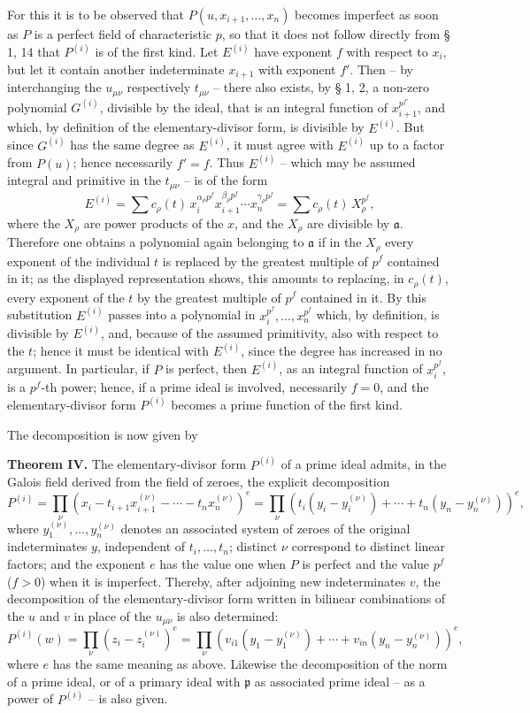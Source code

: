 \documentclass[11pt]{article}
\providecommand{\frakp}{\mathfrak p}
\providecommand{\fraka}{\mathfrak a}
\begin{document}
For this it is to be observed that $P(u,x_{i+1},\ldots,x_n)$ becomes imperfect as soon as $P$ is a perfect field of characteristic $p$, so that it does not follow directly from § 1, 14 that $P^{(i)}$ is of the first kind. Let $E^{(i)}$ have exponent $f$ with respect to $x_i$, but let it contain another indeterminate $x_{i+1}$ with exponent $f'$. Then -- by interchanging the $u_{\mu\nu}$ respectively $t_{\mu\nu}$ -- there also exists, by § 1, 2, a non-zero polynomial $G^{(i)}$, divisible by the ideal, that is an integral function of $x_{i+1}^{p^{f'}}$, and which, by definition of the elementary-divisor form, is divisible by $E^{(i)}$. But since $G^{(i)}$ has the same degree as $E^{(i)}$, it must agree with $E^{(i)}$ up to a factor from $P(u)$; hence necessarily $f'=f$. Thus $E^{(i)}$ -- which may be assumed integral and primitive in the $t_{\mu\nu}$ -- is of the form
\[
 E^{(i)}=\sum c_\rho(t)\,x_i^{\alpha_\rho p^f}x_{i+1}^{\beta_\rho p^f}\cdots x_n^{\gamma_\rho p^f}
       =\sum c_\rho(t)\,X_\rho^{p^f},
\]
where the $X_\rho$ are power products of the $x$, and the $X_\rho$ are divisible by $\fraka$. Therefore one obtains a polynomial again belonging to $\fraka$ if in the $X_\rho$ every exponent of the individual $t$ is replaced by the greatest multiple of $p^f$ contained in it; as the displayed representation shows, this amounts to replacing, in $c_\rho(t)$, every exponent of the $t$ by the greatest multiple of $p^f$ contained in it. By this substitution $E^{(i)}$ passes into a polynomial in $x_i^{p^f},\ldots,x_n^{p^f}$ which, by definition, is divisible by $E^{(i)}$, and, because of the assumed primitivity, also with respect to the $t$; hence it must be identical with $E^{(i)}$, since the degree has increased in no argument. In particular, if $P$ is perfect, then $E^{(i)}$, as an integral function of $x_i^{p^f}$, is a $p^f$-th power; hence, if a prime ideal is involved, necessarily $f=0$, and the elementary-divisor form $P^{(i)}$ becomes a prime function of the first kind.

The decomposition is now given by

\textbf{Theorem IV.} The elementary-divisor form $P^{(i)}$ of a prime ideal admits, in the Galois field derived from the field of zeroes, the explicit decomposition
\[
 P^{(i)}=\prod_\nu (x_i-t_{i+1}x_{i+1}^{(\nu)}-\cdots-t_nx_n^{(\nu)})^e
 =\prod_\nu (t_i(y_i-y_i^{(\nu)})+\cdots+t_n(y_n-y_n^{(\nu)}))^e,
\]
where $y_1^{(\nu)},\ldots,y_n^{(\nu)}$ denotes an associated system of zeroes of the original indeterminates $y$, independent of $t_i,\ldots,t_n$; distinct $\nu$ correspond to distinct linear factors; and the exponent $e$ has the value one when $P$ is perfect and the value $p^f$ ($f>0$) when it is imperfect. Thereby, after adjoining new indeterminates $v$, the decomposition of the elementary-divisor form written in bilinear combinations of the $u$ and $v$ in place of the $u_{\mu\nu}$ is also determined:
\[
 P^{(i)}(w)=\prod_\nu (z_i-z_i^{(\nu)})^e
 =\prod_\nu (v_{i1}(y_1-y_1^{(\nu)})+\cdots+v_{in}(y_n-y_n^{(\nu)}))^e,
\]
where $e$ has the same meaning as above. Likewise the decomposition of the norm of a prime ideal, or of a primary ideal with $\frakp$ as associated prime ideal -- as a power of $P^{(i)}$ -- is also given.
\end{document}
